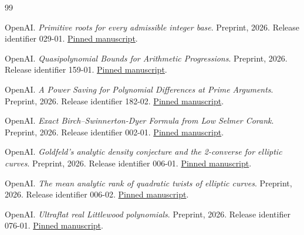 \begin{thebibliography}{99}

 OpenAI. \emph{Primitive roots for every admissible integer base}. Preprint, 2026. Release identifier 029-01. \href{https://github.com/openai/math/blob/adc7f1241b42e322a6451854ab7e4b4c146bf78a/preprints/Primitive-roots-for-every-admissible-integer-base-October-4-2026/primitive-roots-all-integer-bases.pdf}{Pinned manuscript}.

 OpenAI. \emph{Quasipolynomial Bounds for Arithmetic Progressions}. Preprint, 2026. Release identifier 159-01. \href{https://github.com/openai/math/blob/adc7f1241b42e322a6451854ab7e4b4c146bf78a/preprints/Quasipolynomial-Bounds-for-Arithmetic-Progressions-September-23-2026/paper.pdf}{Pinned manuscript}.

 OpenAI. \emph{A Power Saving for Polynomial Differences at Prime Arguments}. Preprint, 2026. Release identifier 182-02. \href{https://github.com/openai/math/blob/adc7f1241b42e322a6451854ab7e4b4c146bf78a/preprints/A-Power-Saving-for-Polynomial-Differences-at-Prime-Arguments-October-5-2026/prime-argument-polynomial-differences.pdf}{Pinned manuscript}.

 OpenAI. \emph{Exact Birch–Swinnerton-Dyer Formula from Low Selmer Corank}. Preprint, 2026. Release identifier 002-01. \href{https://github.com/openai/math/blob/adc7f1241b42e322a6451854ab7e4b4c146bf78a/preprints/Exact-Birch-Swinnerton-Dyer-Formula-from-Low-Selmer-Corank-October-3-2026/exact-bsd-low-selmer-corank.pdf}{Pinned manuscript}.

 OpenAI. \emph{Goldfeld's analytic density conjecture and the 2-converse for elliptic curves}. Preprint, 2026. Release identifier 006-01. \href{https://github.com/openai/math/blob/adc7f1241b42e322a6451854ab7e4b4c146bf78a/preprints/Goldfelds-analytic-density-conjecture-and-the-2-converse-for-elliptic-curves-September-23-2026/paper.pdf}{Pinned manuscript}.

 OpenAI. \emph{The mean analytic rank of quadratic twists of elliptic curves}. Preprint, 2026. Release identifier 006-02. \href{https://github.com/openai/math/blob/adc7f1241b42e322a6451854ab7e4b4c146bf78a/preprints/The-mean-analytic-rank-of-quadratic-twists-of-elliptic-curves-September-23-2026/paper.pdf}{Pinned manuscript}.

 OpenAI. \emph{Ultraflat real Littlewood polynomials}. Preprint, 2026. Release identifier 076-01. \href{https://github.com/openai/math/blob/adc7f1241b42e322a6451854ab7e4b4c146bf78a/preprints/Ultraflat-real-Littlewood-polynomials-October-5-2026/ultraflat-real-littlewood-polynomials.pdf}{Pinned manuscript}.


\end{thebibliography}
